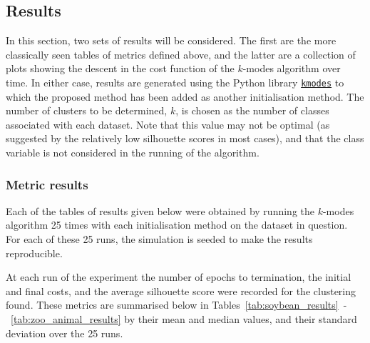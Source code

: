 \subsection{Results}\label{subsec:results}

In this section, two sets of results will be considered. The first are the more
classically seen tables of metrics defined above, and the latter are a
collection of plots showing the descent in the cost function of the \(k\)-modes
algorithm over time. In either case, results are generated using the Python
library \href{https://github.com/nicodv/kmodes}{\texttt{kmodes}} to which the
proposed method has been added as another initialisation method. The number of
clusters to be determined, \(k\), is chosen as the number of classes associated
with each dataset. Note that this value may not be optimal (as suggested by the
relatively low silhouette scores in most cases), and that the class variable is
not considered in the running of the algorithm.

\subsubsection{Metric results}

Each of the tables of results given below were obtained by running the
\(k\)-modes algorithm 25 times with each initialisation method on the dataset in
question. For each of these 25 runs, the simulation is seeded to make the
results reproducible.

At each run of the experiment the number of epochs to termination, the initial
and final costs, and the average silhouette score were recorded for the
clustering found. These metrics are summarised below in
Tables~\ref{tab:soybean_results}~\--~\ref{tab:zoo_animal_results} by their mean
and median values, and their standard deviation over the 25 runs.

\singlespacing%
\begin{table}[H]
    \centering
    \resizebox{.9\textwidth}{!}{%
        
    }
    \label{tab:soybean_results}\vspace{20pt}

    \resizebox{.9\textwidth}{!}{%
        
    }
    \label{tab:mushroom_results}
\end{table}

